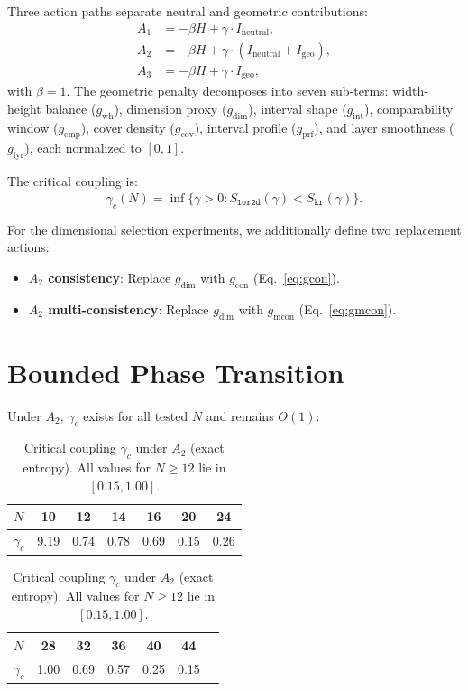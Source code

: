 \documentclass[12pt,a4paper]{article}
\begin{document}
Three action paths separate neutral and geometric contributions:
\begin{align}
    A_1 &= -\beta H + \gamma \cdot I_{\text{neutral}}, \label{eq:A1} \\
    A_2 &= -\beta H + \gamma \cdot (I_{\text{neutral}} + I_{\text{geo}}),
    \label{eq:A2} \\
    A_3 &= -\beta H + \gamma \cdot I_{\text{geo}}, \label{eq:A3}
\end{align}
with $\beta = 1$. The geometric penalty decomposes into seven sub-terms:
width-height balance ($g_{\text{wh}}$), dimension proxy ($g_{\text{dim}}$),
interval shape ($g_{\text{int}}$), comparability window ($g_{\text{cmp}}$),
cover density ($g_{\text{cov}}$), interval profile ($g_{\text{prf}}$), and
layer smoothness ($g_{\text{lyr}}$), each normalized to $[0,1]$.

The critical coupling is:
\begin{equation}
    \gamma_c(N) = \inf\bigl\{\gamma > 0 :
    \bar{S}_{\texttt{lor2d}}(\gamma) < \bar{S}_{\texttt{kr}}(\gamma)\bigr\}.
    \label{eq:gamma_c}
\end{equation}

For the dimensional selection experiments, we additionally define two
replacement actions:
\begin{itemize}[nosep]
\item \textbf{$A_2$ consistency}: Replace $g_{\text{dim}}$ with
$g_{\text{con}}$ (Eq.~\ref{eq:gcon}).
\item \textbf{$A_2$ multi-consistency}: Replace $g_{\text{dim}}$ with
$g_{\text{mcon}}$ (Eq.~\ref{eq:gmcon}).
\end{itemize}

\section{Bounded Phase Transition}
\label{sec:bounded}

Under $A_2$, $\gamma_c$ exists for all tested $N$ and remains $O(1)$:

\begin{table}[h]
\centering
\caption{Critical coupling $\gamma_c$ under $A_2$ (exact entropy). All values
for $N \geq 12$ lie in $[0.15, 1.00]$.}
\label{tab:gamma_c}
\begin{tabular}{@{}lcccccc@{}}
\toprule
$N$ & 10 & 12 & 14 & 16 & 20 & 24 \\
\midrule
$\gamma_c$ & 9.19 & 0.74 & 0.78 & 0.69 & 0.15 & 0.26 \\
\bottomrule
\end{tabular}
\medskip

\begin{tabular}{@{}lcccccc@{}}
\toprule
$N$ & 28 & 32 & 36 & 40 & 44 & \\
\midrule
$\gamma_c$ & 1.00 & 0.69 & 0.57 & 0.25 & 0.15 & \\
\bottomrule
\end{tabular}
\end{table}
\end{document}
